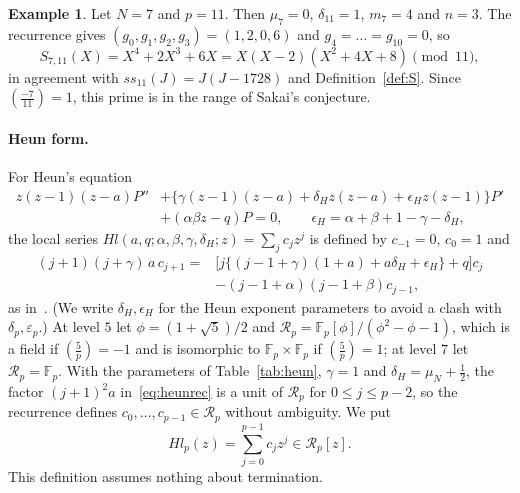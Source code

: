 \documentclass[11pt,a4paper]{article}
\theoremstyle{definition}
\newtheorem{example}[theorem]{Example}
\theoremstyle{remark}
\newcommand{\F}{\mathbb{F}}
\newcommand{\leg}[2]{\left(\frac{#1}{#2}\right)}
\newcommand{\Hl}{\mathit{Hl}}
\numberwithin{equation}{section}
\begin{document}
\begin{example}\label{ex:11}
Let $N=7$ and $p=11$. Then $\mu_7=0$, $\delta_{11}=1$, $m_7=4$ and $n=3$. The
recurrence gives $(g_0,g_1,g_2,g_3)=(1,2,0,6)$ and $g_4=\dots=g_{10}=0$, so
\[
S_{7,11}(X)=X^4+2X^3+6X=X(X-2)(X^2+4X+8)\pmod{11},
\]
in agreement with $ss_{11}(J)=J(J-1728)$ and Definition~\ref{def:S}. Since
$\leg{-7}{11}=1$, this prime is in the range of Sakai's conjecture.
\end{example}

\paragraph{Heun form.}
For Heun's equation
\begin{equation}\label{eq:heunode}
\begin{split}
 z(z-1)(z-a)P''
 &+\bigl\{\gamma(z-1)(z-a)+\delta_Hz(z-a)
                    +\epsilon_Hz(z-1)\bigr\}P'\\
 &+(\alpha\beta z-q)P=0,
 \qquad \epsilon_H=\alpha+\beta+1-\gamma-\delta_H,
\end{split}
\end{equation}
the local series $\Hl(a,q;\alpha,\beta,\gamma,\delta_H;z)=\sum_jc_jz^j$ is
defined by $c_{-1}=0$, $c_0=1$ and
\begin{equation}\label{eq:heunrec}
\begin{split}
(j+1)(j+\gamma)\,a\,c_{j+1}
={}&\bigl[j\{(j-1+\gamma)(1+a)+a\delta_H+\epsilon_H\}+q\bigr]c_j\\
&-(j-1+\alpha)(j-1+\beta)c_{j-1},
\end{split}
\end{equation}
as in~\cite[p.~488]{Nakaya19}. (We write $\delta_H,\epsilon_H$ for the Heun
exponent parameters to avoid a clash with $\delta_p,\varepsilon_p$.) At level
$5$ let $\phi=(1+\sqrt5)/2$ and
$\mathcal R_p=\F_p[\phi]/(\phi^2-\phi-1)$, which is a field if
$\leg5p=-1$ and is isomorphic to $\F_p\times\F_p$ if $\leg5p=1$; at level $7$
let $\mathcal R_p=\F_p$. With the parameters of Table~\ref{tab:heun},
$\gamma=1$ and $\delta_H=\mu_N+\frac12$, the factor $(j+1)^2a$
in~\eqref{eq:heunrec} is a unit of $\mathcal R_p$ for $0\le j\le p-2$, so the
recurrence defines $c_0,\dots,c_{p-1}\in\mathcal R_p$ without ambiguity. We put
\[
\Hl_p(z)=\sum_{j=0}^{p-1}c_jz^j\in\mathcal R_p[z].
\]
This definition assumes nothing about termination.
\end{document}
